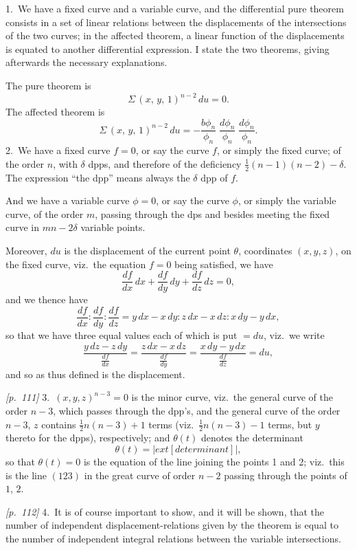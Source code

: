 \documentclass[11pt,a4paper]{book}
\begin{document}
1.\ We have a fixed curve and a variable curve, and the differential pure theorem consists in a set of linear relations between the displacements of the intersections of the two curves; in the affected theorem, a linear function of the displacements is equated to another differential expression. I state the two theorems, giving afterwards the necessary explanations.

The pure theorem is
\[
\Sigma\,(x,\,y,\,1)^{n-2}\,du = 0.
\]
The affected theorem is
\[
\Sigma\,(x,\,y,\,1)^{n-2}\,du = -\frac{b\phi_n}{\phi_n}\;\frac{d\phi_n}{\phi_n}\;\frac{d\phi_n}{\phi_n}.
\]
2.\ We have a fixed curve $f = 0$, or say the curve $f$, or simply the fixed curve; of the order $n$, with $\delta$ dpps, and therefore of the deficiency $\frac{1}{2}(n - 1)(n - 2) - \delta$. The expression ``the dpp'' means always the $\delta$ dpp of $f$.

And we have a variable curve $\phi = 0$, or say the curve $\phi$, or simply the variable curve, of the order $m$, passing through the dps and besides meeting the fixed curve in $mn - 2\delta$ variable points.

Moreover, $du$ is the displacement of the current point $\theta$, coordinates $(x, y, z)$, on the fixed curve, viz.\ the equation $f = 0$ being satisfied, we have
\[
\frac{df}{dx}\,dx + \frac{df}{dy}\,dy + \frac{df}{dz}\,dz = 0,
\]
and we thence have
\[
\frac{df}{dx} : \frac{df}{dy} : \frac{df}{dz} = y \,dx - x \,dy : z \,dx - x \,dz : x \,dy - y \,dx,
\]
so that we have three equal values each of which is put $= du$, viz.\ we write
\[
\frac{y \,dz - z \,dy}{\frac{df}{dx}} = \frac{z \,dx - x \,dz}{\frac{df}{dy}} = \frac{x \,dy - y \,dx}{\frac{df}{dz}} = du,
\]
and so as thus defined is the displacement.

\noindent\textit{[p.~111]} 3.\ $(x, y, z)^{n - 3} = 0$ is the minor curve, viz.\ the general curve of the order $n - 3$, which passes through the dpp's, and the general curve of the order $n - 3$, $z$ contains $\frac{1}{2}n(n - 3) + 1$ terms (viz.\ $\frac{1}{2}n(n - 3) - 1$ terms, but $y$ thereto for the dpps), respectively; and $\theta(t)$ denotes the determinant
\[
\theta(t) =
\left|
	ext{[determinant]}
\right|,
\]
so that $\theta(t) = 0$ is the equation of the line joining the points 1 and 2; viz.\ this is the line $(123)$ in the great curve of order $n - 2$ passing through the points of $1$, $2$.

\bigskip\noindent\textit{[p.~112]} 4.\ It is of course important to show, and it will be shown, that the number of independent displacement-relations given by the theorem is equal to the number of independent integral relations between the variable intersections.
\end{document}
